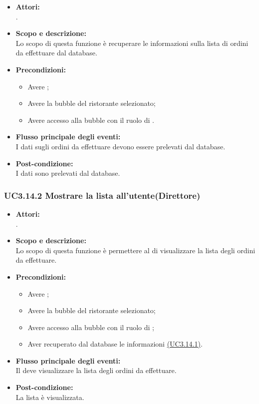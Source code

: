 \begin{itemize}
	\item \textbf{Attori:}
	\\.
	\item \textbf{Scopo e descrizione:} 
	\\Lo scopo di questa funzione è recuperare le informazioni sulla lista di ordini da effettuare dal database.
	\item \textbf{Precondizioni:}
	\begin{itemize}
		\item Avere ;
		\item Avere la bubble del ristorante selezionato;
		\item Avere accesso alla bubble con il ruolo di .
	\end{itemize}
	\item \textbf{Flusso principale degli eventi:}
	\\I dati sugli ordini da effettuare devono essere prelevati dal database.
	\item \textbf{Post-condizione:}
	\\I dati sono prelevati dal database.
\end{itemize}

\subsubsection{UC3.14.2 Mostrare la lista all’utente(Direttore)} \label{UC3.14.2}

\begin{itemize}
	\item \textbf{Attori:}
	\\.
	\item \textbf{Scopo e descrizione:} 
	\\Lo scopo di questa funzione è permettere al  di visualizzare la lista degli ordini da effettuare.
	\item \textbf{Precondizioni:}
	\begin{itemize}
		\item Avere ;
		\item Avere la bubble del ristorante selezionato;
		\item Avere accesso alla bubble con il ruolo di ;
		\item Aver recuperato dal database le informazioni \hyperref[UC3.14.1]{(UC3.14.1)}.
	\end{itemize}
	\item \textbf{Flusso principale degli eventi:}
	\\Il {} deve visualizzare la lista degli ordini da effettuare.
	\item \textbf{Post-condizione:}
	\\La lista è visualizzata.
\end{itemize}


